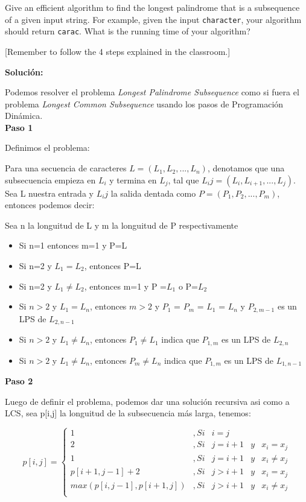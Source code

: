 \documentclass{article}
\begin{document}
Give an efficient algorithm to find the longest palindrome that is a subsequence of a given input string. For example, given the input \verb|character|, your algorithm should return \verb|carac|. What is the running time of your algorithm?

[Remember to follow the 4 steps explained in the classroom.]

\textbf{Solución:}

Podemos resolver el problema \textit{Longest Palindrome Subsequence} como si fuera el problema \textit{Longest Common Subsequence} usando los pasos de Programación Dinámica.\\

\textbf{Paso 1}

Definimos el problema:

Para una secuencia de caracteres $L = (L_1, L_2, ..., L_n)$, denotamos que una subsecuencia empieza en $L_i$ y termina en $L_j$, tal que $L_ij = (L_i, L_{i+1}, ..., L_j)$.
Sea L nuestra entrada y $L_ij$ la salida dentada como $P=(P_1, P_2, ..., P_m)$, entonces podemos decir:

Sea n la longuitud de L y m la longuitud de P respectivamente

\begin{itemize}

\item Si n=1  entonces m=1 y P=L
\item Si n=2 y $L_1 = L_2$, entonces P=L
\item Si n=2 y $L_1 \neq L_2$, entonces m=1 y P =$L_1$ o P=$L_2$
\item Si $n>2$ y $L_1 = L_n$, entonces $m>2$ y $P_1$ = $P_m$ = $L_1$ = $L_n$ y $P_{2, m-1}$ es un LPS de $L_{2,n-1}$
\item Si $n>2$ y $L_1 \neq L_n$, entonces $P_1 \neq L_1$ indica que $P_{1, m}$ es un LPS de $L_{2,n}$
\item Si $n>2$ y $L_1 \neq L_n$, entonces $P_m \neq L_n$ indica que $P_{1, m}$ es un LPS de $L_{1,n-1}$

\end{itemize}

\textbf{Paso 2}

Luego de definir el problema, podemos dar una solución recursiva asi como a LCS, sea p[i,j] la longuitud de la subsecuencia más larga, tenemos:

\begin{center}
$$
p[i,j] =
   \left \{
      \begin{array}{lclcl}
          1             &, Si & i=j\\
          2             &, Si & j=i+1 &y&  x_i = x_j\\
          1             &, Si & j=i+1 &y & x_i \neq x_j\\
          p[i+1,j-1] + 2&, Si & j>i+1 &y&  x_i = x_j\\
 max(p[i,j-1], p[i+1,j])&, Si & j>i+1 &y & x_i \neq x_j\\
      \end{array}
   \right .
$$
\end{center}
\end{document}
